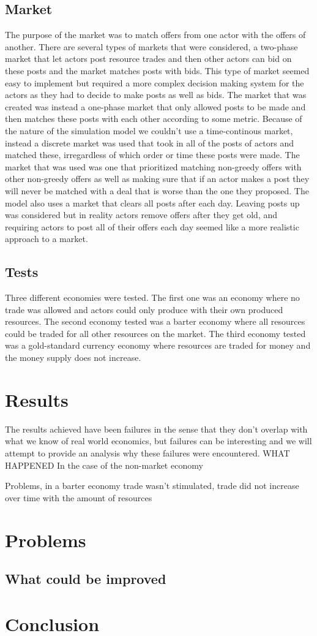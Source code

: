 \documentclass[11p]{article}
\begin{document}
\subsection{Market}
The purpose of the market was to match offers from one actor with the offers of another. There are several types of markets that were considered, a two-phase market that let actors post resource trades and then other actors can bid on these posts and the market matches posts with bids. This type of market seemed easy to implement but required a more complex decision making system for the actors as they had to decide to make posts as well as bids.
The market that was created was instead a one-phase market that only allowed posts to be made and then matches these posts with each other according to some metric. Because of the nature of the simulation model we couldn't use a time-continous market, instead a discrete market was used that took in all of the posts of actors and matched these, irregardless of which order or time these posts were made.
The market that was used was one that prioritized matching non-greedy offers with other non-greedy offers as well as making sure that if an actor makes a post they will never be matched with a deal that is worse than the one they proposed.
The model also uses a market that clears all posts after each day. Leaving posts up was considered but in reality actors remove offers after they get old, and requiring actors to post all of their offers each day seemed like a more realistic approach to a market.
\subsection{Tests}
Three different economies were tested. The first one was an economy where no trade was allowed and actors could only produce with their own produced resources. The second economy tested was a barter economy where all resources could be traded for all other resources on the market. The third economy tested was a gold-standard currency economy where resources are traded for money and the money supply does not increase.
\section{Results}
The results achieved have been failures in the sense that they don't overlap with what we know of real world economics, but failures can be interesting and we will attempt to provide an analysis why these failures were encountered.
WHAT HAPPENED
In the case of the non-market economy

Problems, in a barter economy trade wasn't stimulated, trade did not increase over time with the amount of resources

\section{Problems}
\subsection{What could be improved}


\section{Conclusion}
\end{document}
